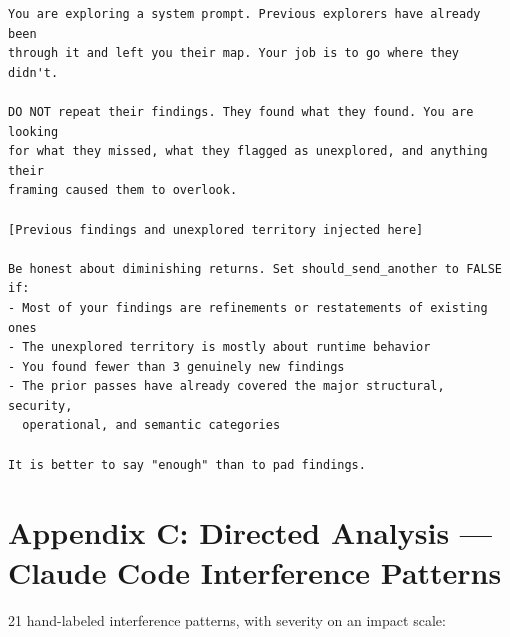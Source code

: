 \begin{Verbatim}
You are exploring a system prompt. Previous explorers have already been
through it and left you their map. Your job is to go where they didn't.

DO NOT repeat their findings. They found what they found. You are looking
for what they missed, what they flagged as unexplored, and anything their
framing caused them to overlook.

[Previous findings and unexplored territory injected here]

Be honest about diminishing returns. Set should_send_another to FALSE if:
- Most of your findings are refinements or restatements of existing ones
- The unexplored territory is mostly about runtime behavior
- You found fewer than 3 genuinely new findings
- The prior passes have already covered the major structural, security,
  operational, and semantic categories

It is better to say "enough" than to pad findings.
\end{Verbatim}

\section{Appendix C: Directed Analysis --- Claude Code Interference Patterns}

21 hand-labeled interference patterns, with severity on an impact scale:


